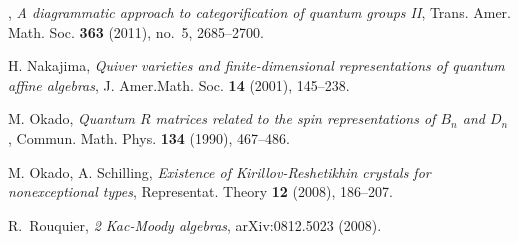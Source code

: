 \documentclass[11pt, leqno]{amsart}
\theoremstyle{definition}
\numberwithin{equation}{section}
\begin{document}
\begin{thebibliography}{99}
\bysame, \emph{A diagrammatic approach to categorification of quantum groups
  {II}}, Trans. Amer. Math. Soc. \textbf{363} (2011), no.~5, 2685--2700.

 H. Nakajima, {\it Quiver varieties and finite-dimensional representations of quantum
affine algebras}, J. Amer.Math. Soc. {\bf 14} (2001), 145--238.

M. Okado, {\it Quantum $R$ matrices related to the spin representations of $B_n$ and $D_n$},
Commun. Math. Phys. {\bf 134} (1990), 467--486.

 M. Okado, A. Schilling, {\it Existence of Kirillov-Reshetikhin crystals for nonexceptional types},
Representat. Theory {\bf 12} (2008), 186--207.

R.~Rouquier, \emph{2 {K}ac-{M}oody algebras}, arXiv:0812.5023 (2008).

\end{thebibliography}
\end{document}
